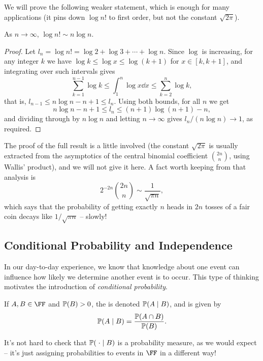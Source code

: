 \documentclass[a4paper]{scrartcl}
\begin{document}
We will prove the following weaker statement, which is enough for many applications (it pins down $\log n!$ to first order, but not the constant $\sqrt{2\pi}$).

\begin{proposition}
	As $n \rightarrow \infty$, $\log n! \sim n \log n$.
\end{proposition}
\begin{proof}
	Let $l_n = \log n! = \log 2 + \log 3 + \cdots + \log n$. Since $\log$ is increasing, for any integer $k$ we have $\log k \leq \log x \leq \log(k+1)$ for $x \in [k, k+1]$, and integrating over such intervals gives
	$$
	\sum_{k = 1}^{n - 1} \log k \leq \int_1^n \log x \dd x \leq \sum_{k = 2}^{n} \log k,
	$$
	that is, $l_{n - 1} \leq n \log n - n + 1 \leq l_n$. Using both bounds, for all $n$ we get
	$$
	n \log n - n + 1 \leq l_n \leq (n + 1)\log (n + 1) - n,
	$$
	and dividing through by $n \log n$ and letting $n \rightarrow \infty$ gives $l_n / (n \log n) \rightarrow 1$, as required.
\end{proof}

The proof of the full result is a little involved (the constant $\sqrt{2\pi}$ is usually extracted from the asymptotics of the central binomial coefficient $\binom{2n}{n}$, using Wallis' product), and we will not give it here. A fact worth keeping from that analysis is
$$
2^{-2n}\binom{2n}{n} \sim \frac{1}{\sqrt{\pi n}},
$$
which says that the probability of getting exactly $n$ heads in $2n$ tosses of a fair coin decays like $1/\sqrt{\pi n}$ -- slowly!

\subsection{Conditional Probability and Independence}

In our day-to-day experience, we know that knowledge about one event can influence how likely we determine another event is to occur. This type of thinking motivates the introduction of \emph{conditional probability}.

\begin{definition}
	If $A, B \in \FF$ and $\mathbb{P}(B) > 0$, the  is denoted $\mathbb{P}(A \mid B)$, and is given by
	$$
	\mathbb{P}(A \mid B) = \frac{\mathbb{P}(A \cap B)}{\mathbb{P}(B)}.
	$$
\end{definition}

It's not hard to check that $\mathbb{P}(\; \cdot \mid B)$ is a probability measure, as we would expect -- it's just assigning probabilities to events in $\FF$ in a different way!
\end{document}
